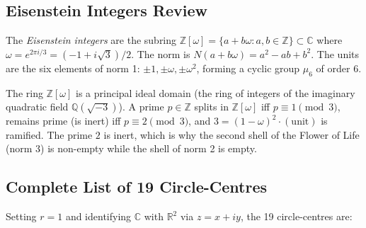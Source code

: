 \subsection{Eisenstein Integers Review}
\label{subsec:fol-eisenstein-review}

The \emph{Eisenstein integers} are the subring
\(\mathbb{Z}[\omega]=\{a+b\omega:a,b\in\mathbb{Z}\}\subset\mathbb{C}\)
where \(\omega=e^{2\pi i/3}=(-1+i\sqrt{3})/2\).  The norm is
\(N(a+b\omega)=a^2-ab+b^2\).  The units are the six elements of norm 1:
\(\pm 1, \pm\omega, \pm\omega^2\), forming a cyclic group \(\mu_6\) of
order 6.

The ring \(\mathbb{Z}[\omega]\) is a principal ideal domain (the ring of
integers of the imaginary quadratic field \(\mathbb{Q}(\sqrt{-3})\)).
A prime \(p\in\mathbb{Z}\) splits in \(\mathbb{Z}[\omega]\) iff
\(p\equiv 1\pmod{3}\), remains prime (is inert) iff \(p\equiv 2\pmod{3}\),
and \(3=(1-\omega)^2\cdot(\text{unit})\) is ramified.  The prime \(2\)
is inert, which is why the second shell of the Flower of Life (norm 3)
is non-empty while the shell of norm 2 is empty.

\subsection{Complete List of 19 Circle-Centres}
\label{subsec:fol-19centres}

Setting \(r=1\) and identifying \(\mathbb{C}\) with \(\mathbb{R}^2\)
via \(z=x+iy\), the 19 circle-centres are:

\begin{center}
\end{center}

